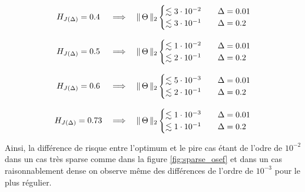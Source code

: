 \begin{equation}
	\begin{array}{ccc}
		H_{J(\Delta)} = 0.4  & \implies & \lVert \, \Theta \, \rVert _ {2}
		\begin{cases}
			\lesssim 3 \cdot 10^{-2} \quad & \Delta = 0.01
			\\
			\lesssim 3\cdot 10^{-1} \quad  & \Delta = 0.2
		\end{cases}
		\\\\
		H_{J(\Delta)} = 0.5  & \implies & \lVert \, \Theta \, \rVert _ {2}
		\begin{cases}
			\lesssim 1 \cdot 10^{-2} \quad & \Delta = 0.01
			\\
			\lesssim 2\cdot 10^{-1} \quad  & \Delta = 0.2
		\end{cases}
		\\\\
		H_{J(\Delta)} = 0.6  & \implies & \lVert \, \Theta \, \rVert _ {2}
		\begin{cases}
			\lesssim 5 \cdot 10^{-3} \quad & \Delta = 0.01
			\\
			\lesssim 2\cdot 10^{-1} \quad  & \Delta = 0.2
		\end{cases}
		\\\\
		H_{J(\Delta)} = 0.73 & \implies & \lVert \, \Theta \, \rVert _ {2}
		\begin{cases}
			\lesssim 1 \cdot 10^{-3} \quad & \Delta = 0.01
			\\
			\lesssim 1\cdot 10^{-1} \quad  & \Delta = 0.2
		\end{cases}
	\end{array}
\end{equation}

Ainsi, la différence de risque entre l'optimum et le pire cas étant de l'odre de $10^{-2}$ dans un cas très sparse comme dans la figure \ref{fig:sparse_osef} et dans un cas raisonnablement dense on observe même des différences de l'ordre de $10^{-3}$ pour le plus régulier.



